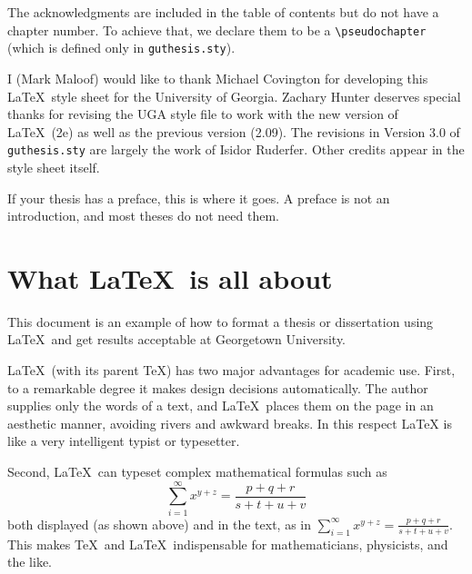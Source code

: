 \documentclass[12pt]{report}
\begin{document}
The acknowledgments are included in the table of contents but do
not have a chapter number.  To achieve that, we
declare them to be a \verb"\pseudochapter" (which is defined only in
\verb"guthesis.sty").

I (Mark Maloof) would like to thank Michael Covington for developing
this \LaTeX\ style sheet for the University of Georgia.
Zachary Hunter deserves special thanks for revising the UGA style
file to work with the new version of \LaTeX\ (2e) as well as the
previous version (2.09).
The revisions in
Version 3.0 of \verb"guthesis.sty" are
largely the work of Isidor Ruderfer.
Other credits appear in the style sheet itself.


If your thesis has a preface, this is where it goes.
A preface is not an introduction, and most theses do not need them.


\tableofcontents

\listoffigures  %
\listoftables   %

\newpage


\chapter{What \LaTeX\ is all about}

This document is an example of how to format a thesis or dissertation
using \LaTeX\  and get results acceptable at Georgetown University.

\LaTeX\ (with its parent \TeX)
has two major advantages for academic use.  First, to a remarkable
degree it makes design decisions automatically.  The author supplies
only the words of a text, and \LaTeX\ places them on the page in an
aesthetic manner, avoiding rivers and awkward breaks.  In this respect
LaTeX is like a very intelligent typist or typesetter.

Second, \LaTeX\ can typeset complex mathematical formulas such as
\[
\sum_{i=1}^{\infty} x^{y+z} = \frac{p+q+r}{s+t+u+v}
\]
both displayed (as shown above) and in the text, as in
$\sum_{i=1}^{\infty} x^{y+z} = \frac{p+q+r}{s+t+u+v}$.
This makes \TeX\ and \LaTeX\ indispensable for mathematicians, physicists,
and the like.
\end{document}
